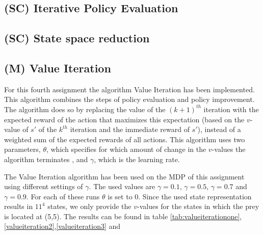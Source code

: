 \documentclass{article}
\begin{document}
\subsection{(SC) Iterative Policy Evaluation}

\subsection{(SC) State space reduction}

\subsection{(M) Value Iteration}
For this fourth assignment the algorithm Value Iteration has been implemented. This algorithm combines the steps of policy evaluation and policy improvement. The algorithm does so by replacing the value of the $(k+1)^{th}$ iteration with the expected reward of the action that maximizes this expectation (based on the $v$-value of $s' $ of the $k^{th}$ iteration and the immediate reward of $s' $), instead of a weighted sum of the expected rewards of all actions. This algorithm uses two parameters, $\theta$, which specifies for which amount of change in the $v$-values the algorithm terminates , and $\gamma$, which is the learning rate.

The Value Iteration algorithm has been used on the MDP of this assignment using different settings of $\gamma$. The used values are $\gamma = 0.1$, $\gamma = 0.5$, $\gamma = 0.7$ and $\gamma = 0.9$. For each of these runs $\theta$ is set to 0. Since the used state representation results in $11^4$ states, we only provide the $v$-values for the states in which the prey is located at (5,5). The results can be found in table \ref{tab:valueiterationone}, \ref{valueiteration2},\ref{valueiteration3} and
  
\end{document}
